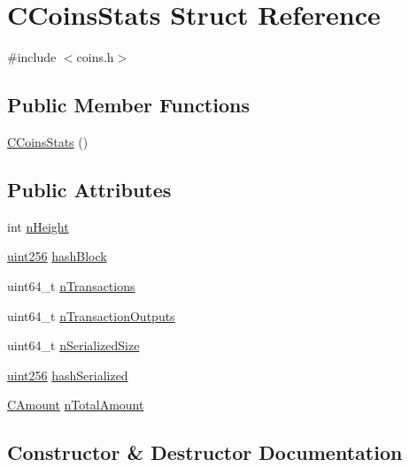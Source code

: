 \hypertarget{struct_c_coins_stats}{}\section{C\+Coins\+Stats Struct Reference}
\label{struct_c_coins_stats}


{\ttfamily \#include $<$coins.\+h$>$}

\subsection*{Public Member Functions}
\begin{DoxyCompactItemize}
\item 
\hyperlink{struct_c_coins_stats_a3f68ce1f423e40599c8d3c4bf2d97aa9}{C\+Coins\+Stats} ()
\end{DoxyCompactItemize}
\subsection*{Public Attributes}
\begin{DoxyCompactItemize}
\item 
int \hyperlink{struct_c_coins_stats_a5972700c4733ce02e12530d758e95d8c}{n\+Height}
\item 
\hyperlink{classuint256}{uint256} \hyperlink{struct_c_coins_stats_a75b32757ea85b8df6453490e1acc4607}{hash\+Block}
\item 
uint64\+\_\+t \hyperlink{struct_c_coins_stats_a0b04da159443c350e9b9e8a39c6a82db}{n\+Transactions}
\item 
uint64\+\_\+t \hyperlink{struct_c_coins_stats_a02612be210ba7c628d04ddedd83b9ff0}{n\+Transaction\+Outputs}
\item 
uint64\+\_\+t \hyperlink{struct_c_coins_stats_ac4302ffc2f8be6e62dbc5655f77e4202}{n\+Serialized\+Size}
\item 
\hyperlink{classuint256}{uint256} \hyperlink{struct_c_coins_stats_a0ce8e745d7a62e4ae41f943333c81d7c}{hash\+Serialized}
\item 
\hyperlink{amount_8h_a4eaf3a5239714d8c45b851527f7cb564}{C\+Amount} \hyperlink{struct_c_coins_stats_a97c76344c650e55377d5f9246a906cc4}{n\+Total\+Amount}
\end{DoxyCompactItemize}


\subsection{Constructor \& Destructor Documentation}
\hypertarget{struct_c_coins_stats_a3f68ce1f423e40599c8d3c4bf2d97aa9}{}
